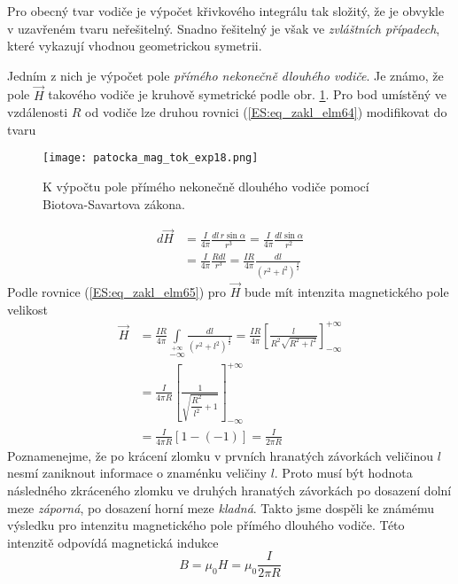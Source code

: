     Pro obecný tvar vodiče je výpočet křivkového integrálu tak složitý, že je obvykle v uzavřeném 
    tvaru neřešitelný. Snadno řešitelný je však ve \emph{zvláštních případech}, které vykazují 
    vhodnou geometrickou symetrii.
    
    Jedním z nich je výpočet pole \emph{přímého nekonečně dlouhého vodiče}. Je známo, že pole 
    \(\vec{H}\) takového vodiče je kruhově symetrické podle obr. 
    \ref{es:fig_patocka_mag_tok_exp18}. Pro bod umístěný ve vzdálenosti \(R\) od vodiče lze 
    druhou rovnici (\ref{ES:eq_zakl_elm64}) modifikovat do tvaru      
    \begin{figure}[ht!]
      \centering
      \texttt{[image: patocka\_mag\_tok\_exp18.png]}
      \caption{K výpočtu pole přímého nekonečně dlouhého vodiče pomocí Biotova-Savartova zákona.}
      \label{es:fig_patocka_mag_tok_exp18}
    \end{figure}
    \begin{align}\label{ES:eq_zakl_elm66}
      d\vec{H} &= \frac{I}{4\pi}\frac{dl\,r\sin\alpha}{r^3}
                = \frac{I}{4\pi}\frac{dl\sin\alpha}{r^2}                 \nonumber \\
               &= \frac{I}{4\pi}\frac{Rdl}{r^3}
                = \frac{IR}{4\pi}\frac{dl}{\left(r^2+l^2\right)^{\frac{3}{2}}}
    \end{align}
    Podle rovnice (\ref{ES:eq_zakl_elm65}) pro \(\vec{H}\) bude mít intenzita magnetického pole 
    velikost 
    \begin{align}\label{ES:eq_zakl_elm67}
      \vec{H} &= \frac{IR}{4\pi}\int\limits_{-\infty}\limits^{+\infty}
                 \frac{dl}{\left(r^2+l^2\right)^{\frac{3}{2}}}
               = \frac{IR}{4\pi} 
                 \left[\frac{l}{R^2\sqrt{R^2+l^2}}\right]_{-\infty}^{+\infty}         \nonumber \\
              &= \frac{I}{4\pi R}
                 \left[\frac{1}{\sqrt{\dfrac{R^2}{l^2}+1}}\right]_{-\infty}^{+\infty} \nonumber \\
              &= \frac{I}{4\pi R}[1-(-1)] = \frac{I}{2\pi R}
    \end{align}
    Poznamenejme, že po krácení zlomku v prvních hranatých závorkách veličinou \(l\) nesmí 
    zaniknout informace o znaménku veličiny \(l\). Proto musí být hodnota následného zkráceného 
    zlomku ve druhých hranatých závorkách po dosazení dolní meze \emph{záporná}, po dosazení horní 
    meze \emph{kladná}. Takto jsme dospěli ke známému výsledku pro intenzitu magnetického pole 
    přímého dlouhého vodiče. Této intenzitě odpovídá magnetická indukce
    \begin{equation}\label{ES:eq_zakl_elm68}
      B = \mu_0H = \mu_0\frac{I}{2\pi R}
    \end{equation}
    
